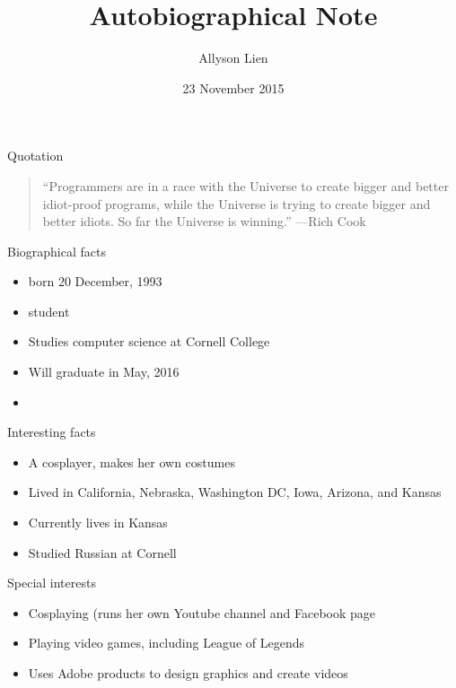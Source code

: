 \documentclass{beamer}
\title{Autobiographical Note}
\author{Allyson Lien}
\institute{Cornell College}
\date{23 November 2015}
\begin{document}
\begin{frame}
  \titlepage
\end{frame}

\begin{frame}{Quotation}
\begin{quotation}
\noindent
``Programmers are in a race with the Universe to create bigger and better idiot-proof programs, while the Universe is trying to create bigger and better idiots.  So far the Universe is winning.''
  \flushright
  ---Rich Cook
  \end{quotation}
\end{frame}

\begin{frame}{Biographical facts}
\begin{itemize}
  \item born 20 December, 1993
  \item student
  \item Studies computer science at Cornell College
  \item Will graduate in May, 2016
  \item 
  \end{itemize}
\end{frame}

\begin{frame}{Interesting facts}
\begin{itemize}
  \item A cosplayer, makes her own costumes 
  \item Lived in California, Nebraska, Washington DC, Iowa, Arizona, and Kansas
  \item Currently lives in Kansas
  \item Studied Russian at Cornell 
  \end{itemize}
\end{frame}

\begin{frame}{Special interests}
\begin{itemize}
  \item Cosplaying (runs her own Youtube channel and Facebook page
  \item Playing video games, including League of Legends
  \item Uses Adobe products to design graphics and create videos
  \end{itemize}
\end{frame}
\end{document}
